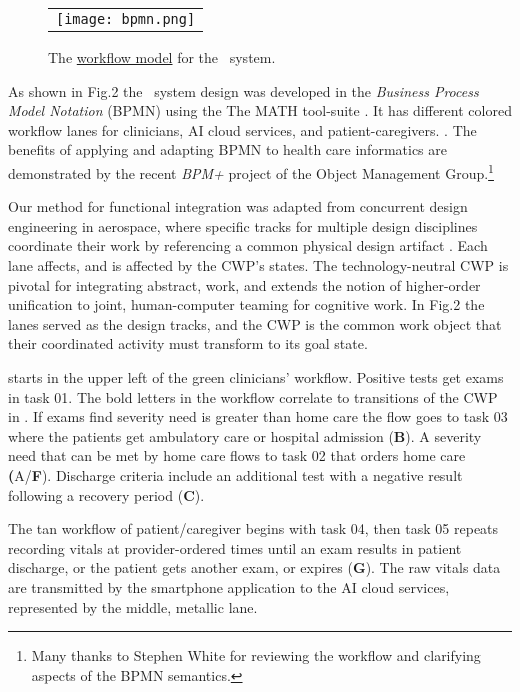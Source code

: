 \begin{figure*}
  \begin{center}
    \begin{tabular}{c}
      \texttt{[image: bpmn.png]}
    \end{tabular}
  \end{center}
\caption{The \href{https://github.com/ericmercer/SPIN-bpmn-cwp-verification-paper/blob/main/26-Oct-2021-BPMN.png}{workflow model} for the \phware\ system.}
\label{fig:bpmn}
\end{figure*}

As shown in Fig.2 the \phware\ system design was developed in the \emph{Business Process Model Notation} (BPMN) \cite{BPMN} using the The MATH tool-suite \cite{workflowmodel}.
It has different colored workflow lanes for clinicians, AI cloud services, and patient-caregivers. .
The benefits of applying and adapting BPMN to health care informatics are demonstrated by the recent \emph{BPM+} project of the Object Management Group.\footnote{Many thanks to Stephen White for reviewing the workflow and clarifying aspects of the BPMN semantics.}

Our method for functional integration was adapted from concurrent design engineering in aerospace, where specific tracks for multiple design disciplines coordinate their work by referencing a common physical design artifact \cite{10.1007/978-1-4471-1538-0_9}.
Each lane affects, and is affected by the CWP's states.
The technology-neutral CWP is pivotal for integrating abstract, work, and extends the notion of higher-order unification \cite{10.1007/3-540-45685-6_2} to joint, human-computer teaming for cognitive work. 
In Fig.2 the lanes served as the design tracks, and the CWP is the common work object that their coordinated activity must transform to its goal state.

 starts in the upper left of the green clinicians' workflow.
Positive tests get exams in task 01. The bold letters in the workflow correlate to transitions of the CWP in .
If exams find severity need is greater than home care the flow goes to task 03 where the patients get ambulatory care or hospital admission (\textbf{B}).
A severity need that can be met by home care flows to task 02 that orders home care \textbf({A}/\textbf{F}).
Discharge criteria include an additional test with a negative result following a recovery period (\textbf{C}).

The tan workflow of patient/caregiver begins with task 04, then task 05 repeats recording vitals at provider-ordered times until an exam results in patient discharge, or the patient gets another exam, or expires (\textbf{G}). 
The raw vitals data are transmitted by the smartphone application to the AI cloud services, represented by the middle, metallic lane. 

